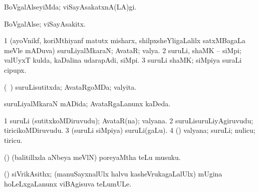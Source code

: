 {{{{{{{{{{{{{\bentry 
{} 
\gl{\kirxvi}
\expl{}
\bmng
 BoVgalAlseyiMda; viSayAsakatxnA(LA)gi. 
\emng
\eentry

\bentry 
{} 
\gl{\nA}
\expl{}
\bmng
 BoVgalAlse; viSayAsakitx. 
\emng
\eentry

\bentry
{} 
\gl{\nA}
\expl{}
\bmng
\bnum
\num{1} (ayoVnikf, koriMthiyanf matutx misharx, shilpxsheYligaLalilx satxMBagaLa meVle mADuva) suruLiyalMkaraN; AvataR; valya. 
\num{2} suruLi, shaMK -- siMpi; valUyxT kulda, kaDalina udarapAdi, siMpi. 
\num{3} suruLi shaMK; siMpiya suraLi cipupx. 
\enum
\emng
\eentry

\bentry
{} 
\gl{\gu}
\expl{}
\bmng
 (\kanmu\ \savi) suruLisutitxda; AvataRgoMDa; valyita. 
\emng
\eentry

\bentry 
{} 
\gl{\gu}
\expl{}
\bmng
suruLiyalMkaraN mADida; AvataRgaLanunx kaDeda. 
\emng
\eentry

\bentry 
{} 
\gl{\nA}
\expl{}
\bmng
\bnum
\num{1} suruLi (sutitxkoMDiruvudu); AvataR(na); valyana. 
\num{2} suruLisuruLiyAgiruvudu; tiricikoMDiruvudu. 
\num{3} (suruLi siMpiya) suruLi(gaLu). 
\num{4} (\aMrashA) valyana; suruLi; nulicu; tiricu. 
\enum
\emng
\eentry

\bentry 
{} 
\gl{\nA}
\expl{}
\bmng
 (\savi) (balitillxda aNbeya meVlN) poreyaMtha teLu musuku. 
\emng
\eentry

\bentry 
{} 
\gl{\nA}
\expl{}
\bmng
 (\aMrashA) siVrikAsithx; (manuSayxnalUlx halvu kasheVrukagaLalUlx) mUgina hoLeLxgaLanunx viBAgisuva teLumULe. 
\emng
\eentry

\bentry
{} 
\gl{\sakirx}
}}}}}}}}}}}}}
